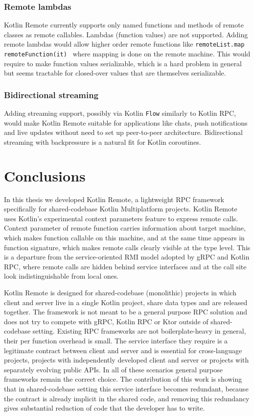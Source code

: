 \documentclass[a4paper,11pt,oneside]{article}
\newcommand{\kotlini}[1]{\texttt{#1}}
\begin{document}
\subsubsection{Remote lambdas}

Kotlin Remote currently supports only named functions and methods of remote classes as remote
callables. Lambdas (function values) are not supported. Adding remote lambdas would allow higher
order remote functions like \kotlini{remoteList.map { remoteFunction(it) }} where mapping is done
on the remote machine. This would require to make function values serializable, which is a hard
problem in general but seems tractable for closed-over values that are themselves serializable.

\subsubsection{Bidirectional streaming}

Adding streaming support, possibly via Kotlin \kotlini{Flow} similarly to Kotlin RPC, would
make Kotlin Remote suitable for applications like chats, push notifications and live updates
without need to set up peer-to-peer architecture. Bidirectional streaming with backpressure is a
natural fit for Kotlin coroutines.

\section{Conclusions}

In this thesis we developed Kotlin Remote, a lightweight RPC framework specifically for
shared-codebase Kotlin Multiplatform projects. Kotlin Remote uses Kotlin's experimental context
parameters feature to express remote calls. Context parameter of remote function carries
information about target machine, which makes function callable on this machine, and at the same
time appears in function signature, which makes remote calls clearly visible at the type level.
This is a departure from the service-oriented RMI model adopted by gRPC and Kotlin RPC, where
remote calls are hidden behind service interfaces and at the call site look indistinguishable from
local ones.

Kotlin Remote is designed for shared-codebase (monolithic) projects in which client and server live
in a single Kotlin project, share data types and are released together. The framework is not meant
to be a general purpose RPC solution and does not try to compete with gRPC, Kotlin RPC or Ktor
outside of shared-codebase setting. Existing RPC frameworks are not boilerplate-heavy in general,
their per function overhead is small. The service interface they require is a legitimate contract
between client and server and is essential for cross-language projects, projects with independently
developed client and server or projects with separately evolving public APIs. In all of these
scenarios general purpose frameworks remain the correct choice. The contribution of this work is
showing that in shared-codebase setting this service interface becomes redundant, because the
contract is already implicit in the shared code, and removing this redundancy gives substantial
reduction of code that the developer has to write. 
\end{document}
